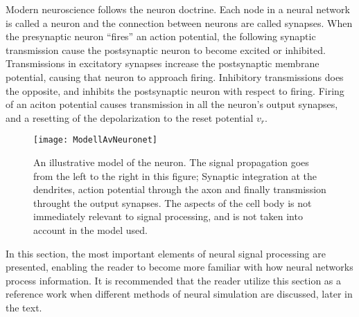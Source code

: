	Modern neuroscience follows the neuron doctrine. 
	Each node in a neural network is called a neuron and the connection between neurons are called synapses.
	When the presynaptic neuron ``fires'' an action potential, the following synaptic transmission cause the postsynaptic neuron to become excited or inhibited.
	Transmissions in excitatory synapses increase the postsynaptic membrane potential, causing that neuron to approach firing. %
	Inhibitory transmissions does the opposite, and inhibits the postsynaptic neuron with respect to firing.
	Firing of an aciton potential causes transmission in all the neuron's output synapses, and a resetting of the depolarization to the reset potential $v_r$. %
	\cite{PrinciplesOfNeuralScience4edKAP02}


\begin{figure}[hbt!p]
	\centering
	\texttt{[image: ModellAvNeuronet]}
	\caption{An illustrative model of the neuron. The signal propagation goes from the left to the right in this figure;
			Synaptic integration at the dendrites, action potential through the axon and finally transmission throught the output synapses. 
			The aspects of the cell body is not immediately relevant to signal processing, and is not taken into account in the model used. }
	\label{figFigurAvNeuronet}
\end{figure}
	
	In this section, the most important elements of neural signal processing are presented, enabling the reader to become more familiar with how neural networks process information.
	It is recommended that the reader utilize this section as a reference work when different methods of neural simulation are discussed, later in the text. %




